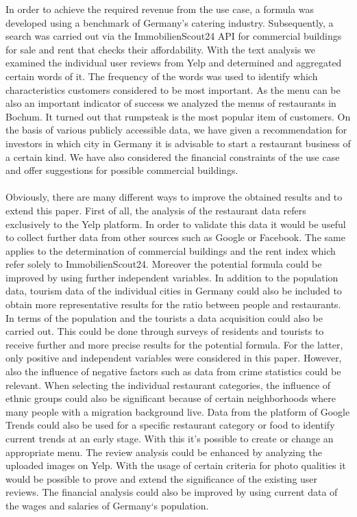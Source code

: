 In order to achieve the required revenue from the use case, a formula was developed using a benchmark of Germany's catering industry. Subsequently, a search was carried out via the ImmobilienScout24 \ac{API} for commercial buildings for sale and rent that checks their affordability.
With the text analysis we examined the individual user reviews from Yelp and determined and aggregated certain words of it. The frequency of the words was used to identify which characteristics customers considered to be most important.
As the menu can be also an important indicator of success we analyzed the menus of restaurants in Bochum. It turned out that rumpsteak is the most popular item of customers. \newline
On the basis of various publicly accessible data, we have given a recommendation for investors in which city in Germany it is advisable to start a restaurant business of a certain kind. We have also considered the financial constraints of the use case and offer suggestions for possible commercial buildings.\\
\\
Obviously, there are many different ways to improve the obtained results and to extend this paper. First of all, the analysis of the restaurant data refers exclusively to the Yelp platform. In order to validate this data it would be useful to collect further data from other sources such as Google or Facebook. The same applies to the determination of commercial buildings and the rent index which refer solely to ImmobilienScout24. \newline
Moreover the potential formula could be improved by using further independent variables. In addition to the population data, tourism data of the individual cities in Germany could also be included to obtain more representative results for the ratio between people and restaurants. In terms of the population and the tourists a data acquisition could also be carried out. This could be done through surveys of residents and tourists to receive further and more precise results for the potential formula. For the latter, only positive and independent variables were considered in this paper. However, also the influence of negative factors such as data from crime statistics could be relevant. \newline
When selecting the individual restaurant categories, the influence of ethnic groups could also be significant because of certain neighborhoods where many people with a migration background live. Data from the platform of Google Trends could also be used for a specific restaurant category or food to identify current trends at an early stage. With this it's possible to create or change an appropriate menu. \newline
The review analysis could be enhanced by analyzing the uploaded images on Yelp. With the usage of certain criteria for photo qualities it would be possible to prove and extend the significance of the existing user reviews. The financial analysis could also be improved by using current data of the wages and salaries of Germany‘s population.